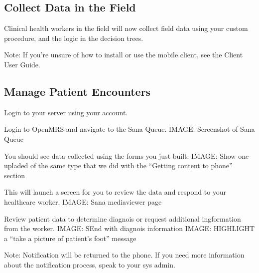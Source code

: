 \documentclass[a4paper,10pt]{article}
\begin{document}
\subsection{Collect Data in the Field}
Clinical health workers in the field will now collect field data using your 
custom procedure, and the logic in the decision trees. 

Note: If you're unsure of how to install or use the mobile client, see the 
Client User Guide.

\subsection{Manage Patient Encounters}
Login to your server using your account.

Login to OpenMRS and navigate to the Sana Queue.
{IMAGE: Screenshot of Sana Queue}

You should see data collected using the forms you just built.
{IMAGE: Show one upladed of the same type that we did with the ``Getting content to phone'' section}

This will launch a screen for you to review the data and respond to your 
healthcare worker.
{IMAGE: Sana mediaviewer page}

Review patient data to determine diagnois or request additional ingformation 
from the worker. 
{IMAGE: SEnd with diagnois information} {IMAGE: HIGHLIGHT a ``take a picture of patient's foot'' message}

Note: Notification will be returned to the phone. If you need more information 
about the notification process, speak to your sys admin. 

\clearpage{}

\cite{
http://www.nhlbi.nih.gov/guidelines/obesity/e_txtbk/txgd/algorthm/algorthm.htm}
\end{document}
